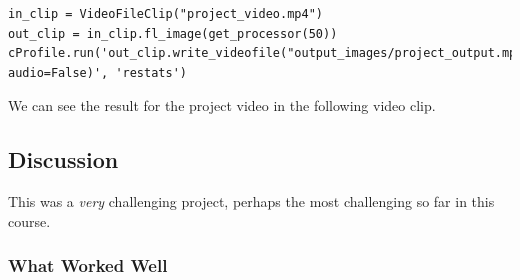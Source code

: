 \documentclass[11pt]{article}
\begin{document}
\begin{verbatim}
in_clip = VideoFileClip("project_video.mp4")
out_clip = in_clip.fl_image(get_processor(50))
cProfile.run('out_clip.write_videofile("output_images/project_output.mp4", audio=False)', 'restats')
\end{verbatim}

We can see the result for the project video in the following
video clip.

\subsection*{Discussion}
\label{sec-1-3}

This was a \emph{very} challenging project, perhaps the most
challenging so far in this course.  

\subsubsection*{What Worked Well}
\label{sec-1-3-1}
\end{document}

